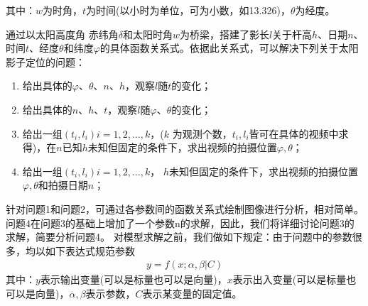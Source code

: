             其中：$w$为时角，$t$为时间(以小时为单位，可为小数，如13.326)，$θ$为经度。
            \par
            通过以太阳高度角 赤纬角$\delta$和太阳时角$w$为桥梁，搭建了影长$l$关于杆高$h$、日期$n$、时间$t$、经度$\theta$和纬度$\varphi$的具体函数关系式。依据此关系式，可以解决下列关于太阳影子定位的问题：
            \begin{enumerate}
            \item 给出具体的$\varphi$、$\theta$、$n$、$h$，观察$l$随$t$的变化；
            \item 给出具体的$n$、$h$、$t$，观察$l$随$\varphi$、$\theta$的变化；
            \item 给出一组$(t_i,l_i )   i=1,2,\dots,k$，($k$ 为观测个数，$t_i,l_i$皆可在具体的视频中求得)，在$n$已知$h$未知但固定的条件下，求出视频的拍摄位置$\varphi,\theta$；
            \item 给出一组$(t_i,l_i )   i=1,2,\dots,k$， $h$未知但固定的条件下，求出视频的拍摄位置$\varphi,\theta$和拍摄日期$n$；
            \end{enumerate}
            \par
            针对问题1和问题2，可通过各参数间的函数关系式绘制图像进行分析，相对简单。问题4在问题3的基础上增加了一个参数n的求解，因此，我们将详细讨论问题3的求解，简要分析问题4。
            对模型求解之前，我们做如下规定：由于问题中的参数很多，均以如下表达式规范参数
            \begin{align*}
            y = f(x;\alpha,\beta|C)
            \end{align*}
            其中：$y$表示输出变量(可以是标量也可以是向量)，$x$表示出入变量(可以是标量也可以是向量)，$\alpha,\beta$表示参数，$C$表示某变量的固定值。
